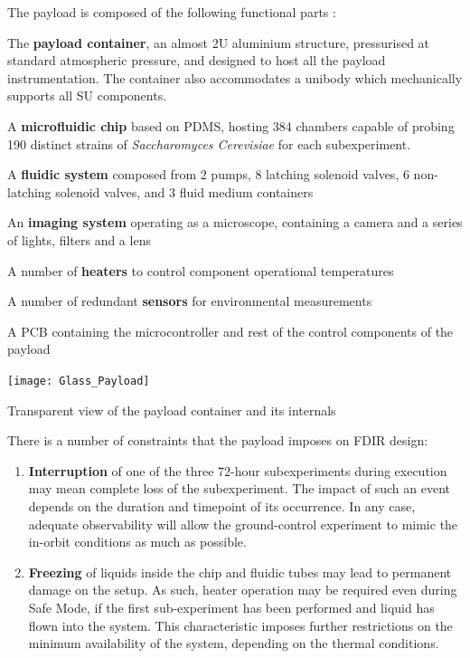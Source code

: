 \documentclass[a4paper,nobib,final]{tufte-book}
\begin{document}
The payload is composed of the following functional parts \autocite{DDJF_PL}:
\begin{compactitem}
	\item The \textbf{payload container}, an almost 2U aluminium structure, pressurised at standard atmospheric pressure, and designed to host all the payload instrumentation. The container also accommodates a unibody which mechanically supports all \ac{SU} components.
	\item A \textbf{microfluidic chip} based on \ac{PDMS}, hosting 384 chambers capable of probing 190 distinct strains of \emph{Saccharomyces Cerevisiae} for each subexperiment.
	\item A \textbf{fluidic system} composed from 2 pumps, 8 latching solenoid valves, 6 non-latching solenoid valves, and 3 fluid medium containers
	\item An \textbf{imaging system} operating as a microscope, containing a camera and a series of lights, filters and a lens
	\item A number of \textbf{heaters} to control component operational temperatures
	\item A number of redundant \textbf{sensors} for environmental measurements
	\item A \ac{PCB} containing the microcontroller and rest of the control components of the payload
\end{compactitem}

\begin{marginfigure}
	\centering
	\texttt{[image: Glass\_Payload]}
	\caption{Transparent view of the payload container and its internals}
	\label{fig:container}
\end{marginfigure}

\label{sec:su_fdir}
There is a number of constraints that the payload imposes on \ac{FDIR} design:
\begin{enumerate}
	\item \textbf{Interruption} of one of the three 72-hour subexperiments during execution may mean complete loss of the subexperiment. The impact of such an event depends on the duration and timepoint of its occurrence. In any case, adequate observability will allow the ground-control experiment to mimic the in-orbit conditions as much as possible.
	\item \textbf{Freezing} of liquids inside the chip and fluidic tubes may lead to permanent damage on the setup. As such, heater operation may be required even during Safe Mode, if the first sub-experiment has been performed and liquid has flown into the system. This characteristic imposes further restrictions on the minimum availability of the system, depending on the thermal conditions.
\end{enumerate}
\end{document}

